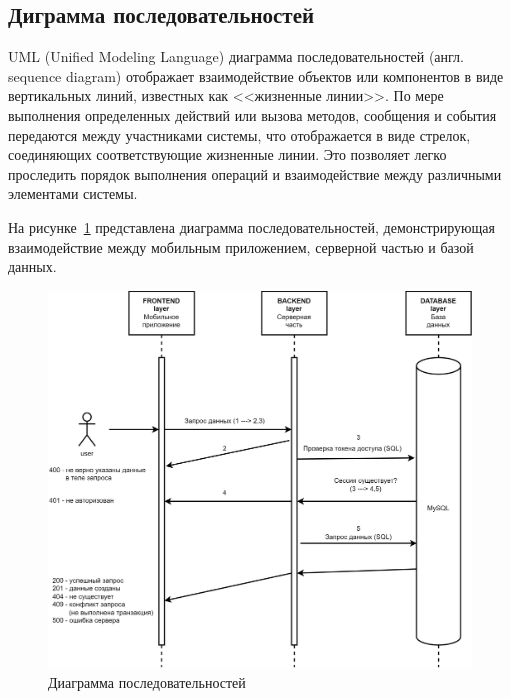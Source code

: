 \subsection{Диграмма последовательностей}




UML (Unified Modeling Language) диаграмма последовательностей (англ. sequence diagram) отображает
взаимодействие объектов или компонентов в виде вертикальных линий, известных как <<жизненные линии>>.
По мере выполнения определенных действий или вызова методов,
сообщения и события передаются между участниками системы,
что отображается в виде стрелок, соединяющих соответствующие жизненные линии.
Это позволяет легко проследить порядок выполнения операций и взаимодействие между различными элементами системы.

На рисунке~\ref{fig:UML_sequence_diagram} представлена диаграмма последовательностей,
демонстрирующая взаимодействие между мобильным приложением, серверной частью и базой данных.

\begin{figure}[!htb]
    \centering

    \includegraphics[width=14cm]
    {images/UML/sequence/sequence.png}

    \caption{Диаграмма последовательностей}

    \label{fig:UML_sequence_diagram}
\end{figure}
